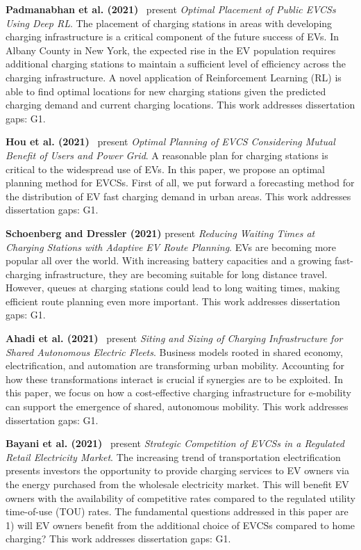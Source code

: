 \documentclass[letterpaper, 12pt, oneside, doublespacing]{Thesis}
\begin{document}
\noindent \textbf{Padmanabhan et al. (2021)}~\cite{optimal_placement_2021} present \textit{Optimal Placement of Public EVCSs Using Deep RL}. The placement of charging stations in areas with developing charging infrastructure is a critical component of the future success of EVs. In Albany County in New York, the expected rise in the EV population requires additional charging stations to maintain a sufficient level of efficiency across the charging infrastructure. A novel application of Reinforcement Learning (RL) is able to find optimal locations for new charging stations given the predicted charging demand and current charging locations. This work addresses dissertation gaps: G1.



\noindent \textbf{Hou et al. (2021)}~\cite{optimal_planning_2021} present \textit{Optimal Planning of EVCS Considering Mutual Benefit of Users and Power Grid}. A reasonable plan for charging stations is critical to the widespread use of EVs. In this paper, we propose an optimal planning method for EVCSs. First of all, we put forward a forecasting method for the distribution of EV fast charging demand in urban areas. This work addresses dissertation gaps: G1.



\noindent \textbf{Schoenberg and Dressler (2021)} present \textit{Reducing Waiting Times at Charging Stations with Adaptive EV Route Planning}. EVs are becoming more popular all over the world. With increasing battery capacities and a growing fast-charging infrastructure, they are becoming suitable for long distance travel. However, queues at charging stations could lead to long waiting times, making efficient route planning even more important. This work addresses dissertation gaps: G1.



\noindent \textbf{Ahadi et al. (2021)}~\cite{siting_and_2021} present \textit{Siting and Sizing of Charging Infrastructure for Shared Autonomous Electric Fleets}. Business models rooted in shared economy, electrification, and automation are transforming urban mobility. Accounting for how these transformations interact is crucial if synergies are to be exploited. In this paper, we focus on how a cost-effective charging infrastructure for e-mobility can support the emergence of shared, autonomous mobility. This work addresses dissertation gaps: G1.



\noindent \textbf{Bayani et al. (2021)}~\cite{strategic_competition_2021} present \textit{Strategic Competition of EVCSs in a Regulated Retail Electricity Market}. The increasing trend of transportation electrification presents investors the opportunity to provide charging services to EV owners via the energy purchased from the wholesale electricity market. This will benefit EV owners with the availability of competitive rates compared to the regulated utility time-of-use (TOU) rates. The fundamental questions addressed in this paper are 1) will EV owners benefit from the additional choice of EVCSs compared to home charging? This work addresses dissertation gaps: G1.
\end{document}
